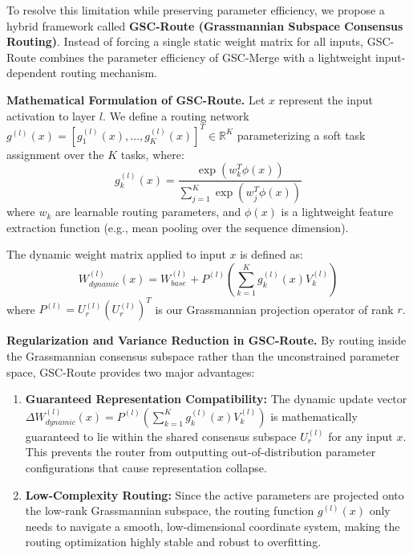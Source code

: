 \documentclass{article}
\theoremstyle{plain}
\theoremstyle{definition}
\theoremstyle{remark}
\begin{document}
To resolve this limitation while preserving parameter efficiency, we propose a hybrid framework called \textbf{GSC-Route (Grassmannian Subspace Consensus Routing)}. Instead of forcing a single static weight matrix for all inputs, GSC-Route combines the parameter efficiency of GSC-Merge with a lightweight input-dependent routing mechanism.

\textbf{Mathematical Formulation of GSC-Route.} Let $x$ represent the input activation to layer $l$. We define a routing network $g^{(l)}(x) = [g_1^{(l)}(x), \dots, g_K^{(l)}(x)]^T \in \mathbb{R}^K$ parameterizing a soft task assignment over the $K$ tasks, where:
\begin{equation}
    g_k^{(l)}(x) = \frac{\exp\left(w_k^T \phi(x)\right)}{\sum_{j=1}^K \exp\left(w_j^T \phi(x)\right)}
\end{equation}
where $w_k$ are learnable routing parameters, and $\phi(x)$ is a lightweight feature extraction function (e.g., mean pooling over the sequence dimension).

The dynamic weight matrix applied to input $x$ is defined as:
\begin{equation}
    W_{dynamic}^{(l)}(x) = W_{base}^{(l)} + P^{(l)} \left( \sum_{k=1}^K g_k^{(l)}(x) V_k^{(l)} \right)
\end{equation}
where $P^{(l)} = U_r^{(l)} (U_r^{(l)})^T$ is our Grassmannian projection operator of rank $r$.

\textbf{Regularization and Variance Reduction in GSC-Route.} By routing inside the Grassmannian consensus subspace rather than the unconstrained parameter space, GSC-Route provides two major advantages:
\begin{enumerate}
    \item \textbf{Guaranteed Representation Compatibility:} The dynamic update vector $\Delta W_{dynamic}^{(l)}(x) = P^{(l)} \left( \sum_{k=1}^K g_k^{(l)}(x) V_k^{(l)} \right)$ is mathematically guaranteed to lie within the shared consensus subspace $U_r^{(l)}$ for any input $x$. This prevents the router from outputting out-of-distribution parameter configurations that cause representation collapse.
    \item \textbf{Low-Complexity Routing:} Since the active parameters are projected onto the low-rank Grassmannian subspace, the routing function $g^{(l)}(x)$ only needs to navigate a smooth, low-dimensional coordinate system, making the routing optimization highly stable and robust to overfitting.
\end{enumerate}
\end{document}
